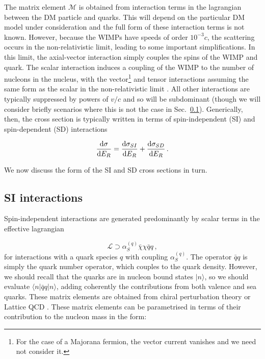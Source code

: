 The matrix element $\mathcal{M}$ is obtained from interaction terms in the lagrangian between the DM particle and quarks. This will depend on the particular DM model under consideration and the full form of these interaction terms is not known. However, because the WIMPs have speeds of order $10^{-3} c$, the scattering occurs in the non-relativistic limit, leading to some important simplifications. In this limit, the axial-vector interaction simply couples the spins of the WIMP and quark. The scalar interaction induces a coupling of the WIMP to the number of nucleons in the nucleus, with the vector\footnote{For the case of a Majorana fermion, the vector current vanishes and we need not consider it.} and tensor interactions assuming the same form as the scalar in the non-relativistic limit \cite{Jungman:1995}. All other interactions are typically suppressed by powers of $v/c$ and so will be subdominant (though we will consider briefly scenarios where this is not the case in Sec.~\ref{}).  Generically, then, the cross section is typically written in terms of spin-independent (SI) and spin-dependent (SD) interactions \cite{Goodman:1985} 

\begin{equation}
\frac{\mathrm{d}\sigma}{\mathrm{d}E_R} = \frac{\mathrm{d}\sigma_{SI}}{\mathrm{d}E_R} + \frac{\mathrm{d}\sigma_{SD}}{\mathrm{d}E_R}\,.
\end{equation}

We now discuss the form of the SI and SD cross sections in turn.

\subsection{SI interactions}

Spin-independent interactions are generated predominantly by scalar terms in the effective lagrangian


\begin{equation}
\label{eq:ScalarInt}
\mathcal{L} \supset \alpha_S^{(q)} \bar{\chi} \chi \bar{q} q \,,
\end{equation}
for interactions with a quark species $q$ with coupling $\alpha_S^{(q)}$. The operator $\bar{q} q$ is simply the quark number operator, which couples to the quark density. However, we should recall that the quarks are in nucleon bound states $|n\rangle$, so we should evaluate $\langle n|\bar{q}q|n\rangle$, adding coherently the contributions from both valence and sea quarks. These matrix elements are obtained from chiral perturbation theory \cite{Alarcon:2012} or Lattice QCD \cite{Bali:2012}. These matrix elements can be parametrised in terms of their contribution to the nucleon mass in the form:

